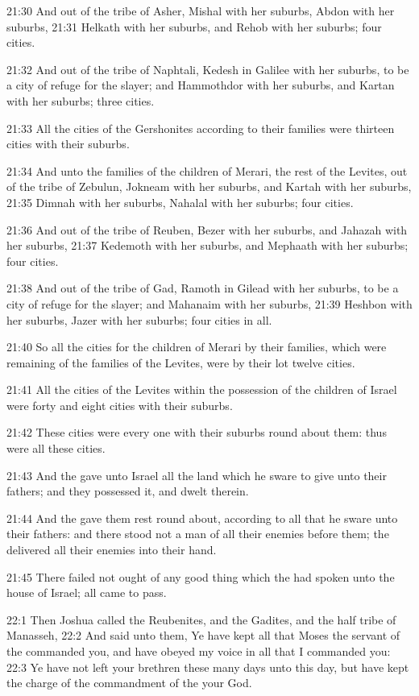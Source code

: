 21:30 And out of the tribe of Asher, Mishal with her suburbs, Abdon with her suburbs, 21:31 Helkath with her suburbs, and Rehob with her suburbs; four cities.

21:32 And out of the tribe of Naphtali, Kedesh in Galilee with her suburbs, to be a city of refuge for the slayer; and Hammothdor with her suburbs, and Kartan with her suburbs; three cities.

21:33 All the cities of the Gershonites according to their families were thirteen cities with their suburbs.

21:34 And unto the families of the children of Merari, the rest of the Levites, out of the tribe of Zebulun, Jokneam with her suburbs, and Kartah with her suburbs, 21:35 Dimnah with her suburbs, Nahalal with her suburbs; four cities.

21:36 And out of the tribe of Reuben, Bezer with her suburbs, and Jahazah with her suburbs, 21:37 Kedemoth with her suburbs, and Mephaath with her suburbs; four cities.

21:38 And out of the tribe of Gad, Ramoth in Gilead with her suburbs, to be a city of refuge for the slayer; and Mahanaim with her suburbs, 21:39 Heshbon with her suburbs, Jazer with her suburbs; four cities in all.

21:40 So all the cities for the children of Merari by their families, which were remaining of the families of the Levites, were by their lot twelve cities.

21:41 All the cities of the Levites within the possession of the children of Israel were forty and eight cities with their suburbs.

21:42 These cities were every one with their suburbs round about them: thus were all these cities.

21:43 And the \LORD gave unto Israel all the land which he sware to give unto their fathers; and they possessed it, and dwelt therein.

21:44 And the \LORD gave them rest round about, according to all that he sware unto their fathers: and there stood not a man of all their enemies before them; the \LORD delivered all their enemies into their hand.

21:45 There failed not ought of any good thing which the \LORD had spoken unto the house of Israel; all came to pass.

22:1 Then Joshua called the Reubenites, and the Gadites, and the half tribe of Manasseh, 22:2 And said unto them, Ye have kept all that Moses the servant of the \LORD commanded you, and have obeyed my voice in all that I commanded you: 22:3 Ye have not left your brethren these many days unto this day, but have kept the charge of the commandment of the \LORD your God.


